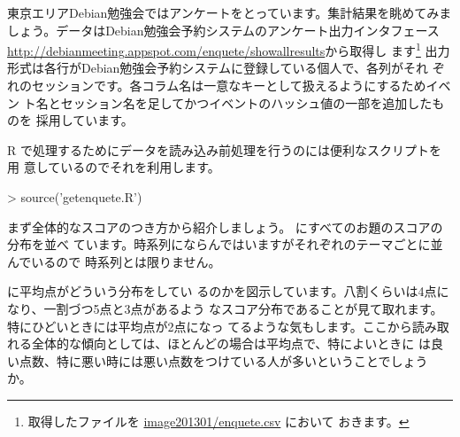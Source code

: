 \documentclass[mingoth,a4paper]{jsarticle}
\begin{document}
東京エリアDebian勉強会ではアンケートをとっています。集計結果を眺めてみま
しょう。データはDebian勉強会予約システムのアンケート出力インタフェース
\url{http://debianmeeting.appspot.com/enquete/showallresults}から取得し
ます\footnote{取得したファイルを \url{image201301/enquete.csv} において
おきます。}
出力形式は各行がDebian勉強会予約システムに登録している個人で、各列がそれ
ぞれのセッションです。各コラム名は一意なキーとして扱えるようにするためイベン
ト名とセッション名を足してかつイベントのハッシュ値の一部を追加したものを
採用しています。

R で処理するためにデータを読み込み前処理を行うのには便利なスクリプトを用
意しているのでそれを利用します。

\begin{commandline}
> source('getenquete.R')
\end{commandline}

まず全体的なスコアのつき方から紹介しましょう。
にすべてのお題のスコアの分布を並べ
ています。時系列にならんではいますがそれぞれのテーマごとに並んでいるので
時系列とは限りません。

に平均点がどういう分布をしてい
るのかを図示しています。八割くらいは4点になり、一割づつ5点と3点があるよう
なスコア分布であることが見て取れます。特にひどいときには平均点が2点になっ
てるような気もします。ここから読み取れる全体的な傾向としては、ほとんどの場合は平均点で、特によいときに
は良い点数、特に悪い時には悪い点数をつけている人が多いということでしょう
か。
\end{document}

